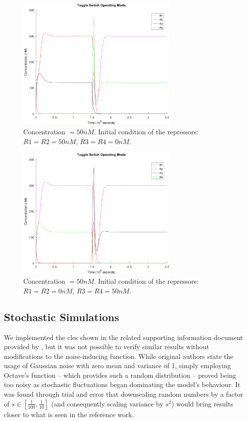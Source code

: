     \begin{figure}[!htbp]
      \centering
      \includegraphics[width=0.71\textwidth]{img/switch-C-1.png}
      \caption{Concentration $= 50nM$. Initial condition of the repressors: $R1 = R2 = 50nM$, $R3 = R4 = 0nM$.}
      \label{fig.switch-C}
    \end{figure}

    \begin{figure}[!htbp]
      \centering
      \includegraphics[width=0.71\textwidth]{img/switch-D-1.png}
      \caption{Concentration $= 50nM$. Initial condition of the repressors: $R1 = R2 = 0nM$, $R3 = R4 = 50nM$.}
      \label{fig.switch-D}
    \end{figure}


  \subsection{Stochastic Simulations}

    We implemented the \ac{cles} shown in the related supporting information document provided by \citet{originals}, but it was not possible to verify similar results without modifications to the noise-inducing function.
    While original authors state the usage of Gaussian noise with zero mean and variance of 1, simply employing Octave's  function -- which provides such a random distribution \cite{randn} -- proved being too noisy as stochastic fluctuations began dominating the model's behaviour.
    It was found through trial and error that downscaling random numbers by a factor of $s \in [\frac{1}{100}, \frac{1}{10}]$ (and consequently scaling variance by $s^2$) would bring results closer to what is seen in the reference work.

